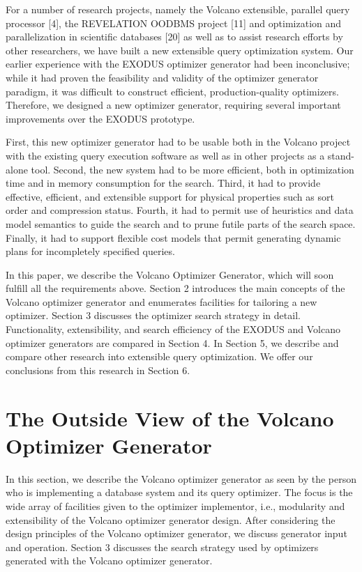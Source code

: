 \documentclass[a4paper,12pt,notitlepage,twoside,openright]{article}
\begin{document}
For a number of research projects, namely the Volcano extensible,
parallel query processor {[}4{]}, the REVELATION OODBMS project {[}11{]}
and optimization and parallelization in scientific databases {[}20{]} as
well as to assist research efforts by other researchers, we have built a
new extensible query optimization system. Our earlier experience with
the EXODUS optimizer generator had been inconclusive; while it had
proven the feasibility and validity of the optimizer generator paradigm,
it was difficult to construct efficient, production-quality optimizers.
Therefore, we designed a new optimizer generator, requiring several
important improvements over the EXODUS prototype.

First, this new optimizer generator had to be usable both in the Volcano
project with the existing query execution software as well as in other
projects as a stand-alone tool. Second, the new system had to be more
efficient, both in optimization time and in memory consumption for the
search. Third, it had to provide effective, efficient, and extensible
support for physical properties such as sort order and compression
status. Fourth, it had to permit use of heuristics and data model
semantics to guide the search and to prune futile parts of the search
space. Finally, it had to support flexible cost models that permit
generating dynamic plans for incompletely specified queries.

In this paper, we describe the Volcano Optimizer Generator, which will
soon fulfill all the requirements above. Section 2 introduces the main
concepts of the Volcano optimizer generator and enumerates facilities
for tailoring a new optimizer. Section 3 discusses the optimizer search
strategy in detail. Functionality, extensibility, and search efficiency
of the EXODUS and Volcano optimizer generators are compared in Section
4. In Section 5, we describe and compare other research into extensible
query optimization. We offer our conclusions from this research in
Section 6.

\hypertarget{the-outside-view-of-the-volcano-optimizer-generator}{%
\section{The Outside View of the Volcano Optimizer
Generator}\label{the-outside-view-of-the-volcano-optimizer-generator}}

In this section, we describe the Volcano optimizer generator as seen by
the person who is implementing a database system and its query
optimizer. The focus is the wide array of facilities given to the
optimizer implementor, i.e., modularity and extensibility of the Volcano
optimizer generator design. After considering the design principles of
the Volcano optimizer generator, we discuss generator input and
operation. Section 3 discusses the search strategy used by optimizers
generated with the Volcano optimizer generator.
\end{document}
